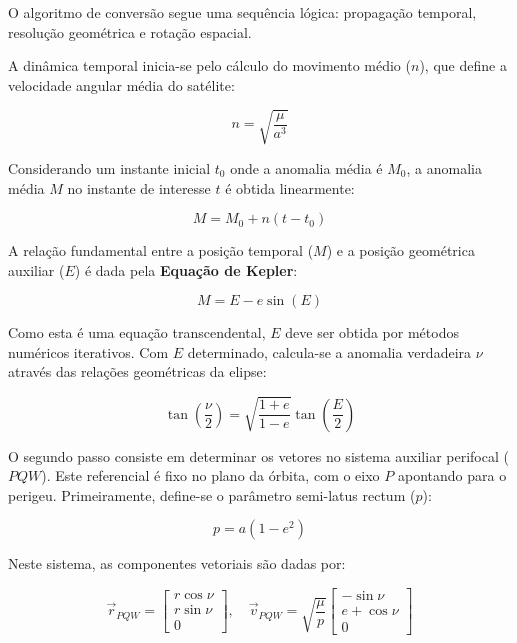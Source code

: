 O algoritmo de conversão segue uma sequência lógica: propagação temporal, resolução geométrica e rotação espacial.

A dinâmica temporal inicia-se pelo cálculo do movimento médio ($n$), que define a velocidade angular média do satélite:

\begin{equation}
    n = \sqrt{\frac{\mu}{a^3}}
    \label{eq:movimento_medio}
\end{equation}

Considerando um instante inicial $t_0$ onde a anomalia média é $M_0$, a anomalia média $M$ no instante de interesse $t$ é obtida linearmente:

\begin{equation}
    M = M_0 + n(t - t_0)
    \label{eq:propagacao_media}
\end{equation}

A relação fundamental entre a posição temporal ($M$) e a posição geométrica auxiliar ($E$) é dada pela \textbf{Equação de Kepler}:

\begin{equation}
    M = E - e \sin(E)
    \label{eq:kepler}
\end{equation}

Como esta é uma equação transcendental, $E$ deve ser obtida por métodos numéricos iterativos. Com $E$ determinado, calcula-se a anomalia verdadeira $\nu$ através das relações geométricas da elipse:

\begin{equation}
    \tan\left(\frac{\nu}{2}\right) = \sqrt{\frac{1+e}{1-e}} \tan\left(\frac{E}{2}\right)
    \label{eq:anomalia_verdadeira_E}
\end{equation}

O segundo passo consiste em determinar os vetores no sistema auxiliar perifocal ($PQW$). Este referencial é fixo no plano da órbita, com o eixo $P$ apontando para o perigeu. Primeiramente, define-se o parâmetro semi-latus rectum ($p$):

\begin{equation}
    p = a(1-e^2)
\end{equation}

Neste sistema, as componentes vetoriais são dadas por:

\begin{equation}
    \vec{r}_{PQW} = \begin{bmatrix} r \cos \nu \\ r \sin \nu \\ 0 \end{bmatrix}
    , \quad
    \vec{v}_{PQW} = \sqrt{\frac{\mu}{p}} \begin{bmatrix} -\sin \nu \\ e + \cos \nu \\ 0 \end{bmatrix}
    \label{eq:vetores_pqw}
\end{equation}

